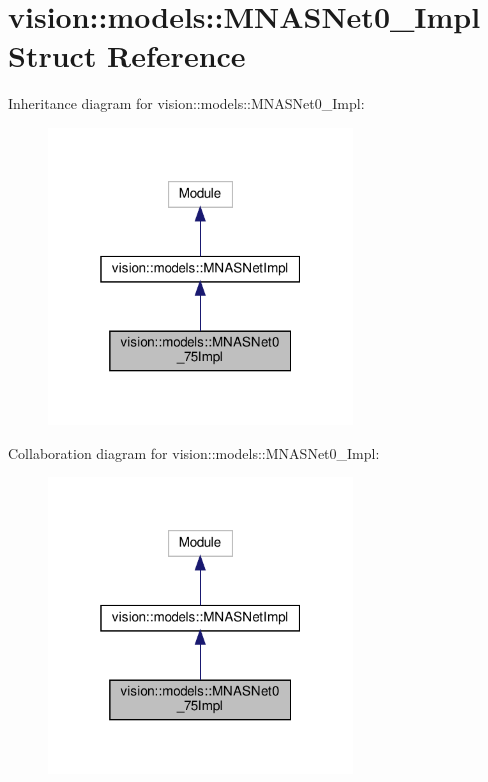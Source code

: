 \hypertarget{structvision_1_1models_1_1MNASNet0__75Impl}{}\section{vision\+:\+:models\+:\+:M\+N\+A\+S\+Net0\+\_\+Impl Struct Reference}
\label{structvision_1_1models_1_1MNASNet0__75Impl}


Inheritance diagram for vision\+:\+:models\+:\+:M\+N\+A\+S\+Net0\+\_\+Impl\+:
\nopagebreak
\begin{figure}[H]
\begin{center}
\leavevmode
\includegraphics[width=229pt]{structvision_1_1models_1_1MNASNet0__75Impl__inherit__graph}
\end{center}
\end{figure}


Collaboration diagram for vision\+:\+:models\+:\+:M\+N\+A\+S\+Net0\+\_\+Impl\+:
\nopagebreak
\begin{figure}[H]
\begin{center}
\leavevmode
\includegraphics[width=229pt]{structvision_1_1models_1_1MNASNet0__75Impl__coll__graph}
\end{center}
\end{figure}
